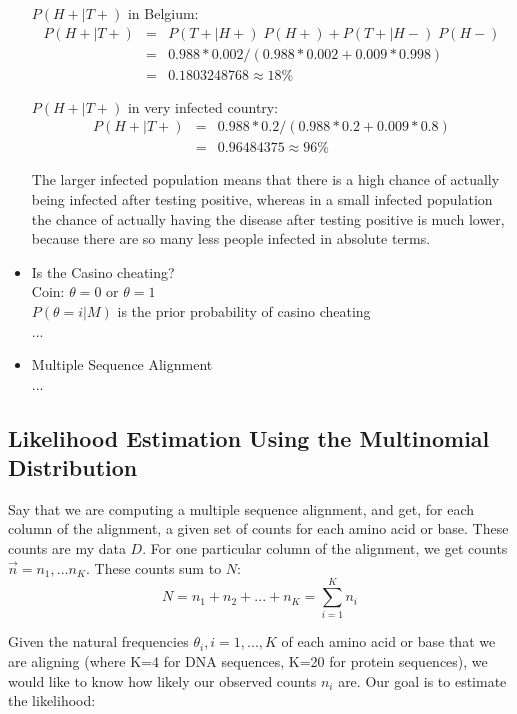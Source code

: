 \begin{itemize}
$P(H+|T+)$ in Belgium:
\begin{eqnarray}
P(H+|T+) & = & P(T+|H+) \; P(H+) + P(T+|H-) \; P(H-) \\
& = & 0.988 * 0.002 / (0.988 * 0.002 + 0.009 *0.998) \\
& = & 0.1803248768 \approx 18 \%
\end{eqnarray}

$P(H+|T+)$ in very infected country:
\begin{eqnarray}
P(H+|T+) 
& = & 0.988 * 0.2 / (0.988 * 0.2 + 0.009 * 0.8) \\
& = & 0.96484375 \approx 96 \%
\end{eqnarray}

The larger infected population means that there is a high chance of actually being infected after testing positive, whereas in a small infected population the chance of actually having the disease after testing positive is much lower, because there are so many less people infected in absolute terms.

\item Is the Casino cheating? \\
Coin: $\theta=0$ or $\theta=1$ \\
$P(\theta=i|M)$ is the prior probability of casino cheating \\
...

\item Multiple Sequence Alignment \\
...
\end{itemize}


\subsection{Likelihood Estimation Using the Multinomial Distribution}
\label{sec:likelihood:multinomial}

Say that we are computing a multiple sequence alignment, and get, for each column of the alignment, a given set of counts for each amino acid or base. These counts are my data $D$.
For one particular column of the alignment, we get counts $\vec{n} = n_1, ... n_K$. These counts sum to $N$:
\begin{equation}
N = n_1 + n_2 + ... + n_K = \sum_{i=1}^K n_i
\end{equation}

Given the natural frequencies $\theta_i, i=1,...,K$ of each amino acid or base that we are aligning (where K=4 for DNA sequences, K=20 for protein sequences), we would like to know how likely our observed counts $n_i$ are. Our goal is to estimate the likelihood:

